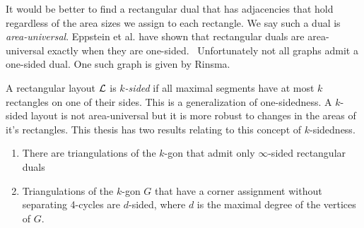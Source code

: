   It would be better to find a rectangular dual that has adjacencies that hold regardless of the area sizes we assign to each rectangle. We say such a dual is \emph{area-universal}.
  Eppstein et al. have shown that rectangular duals are area-universal exactly when they are one-sided.~\cite{Eppstein2012} Unfortunately not all graphs admit a one-sided dual. One such graph is given by Rinsma.~\cite{Rinsma1987} 

  A rectangular layout $\mathcal{L}$ is \emph{$k$-sided} if all maximal segments have at most $k$ rectangles on one of their sides. This is a generalization of one-sidedness. A $k$-sided layout is not area-universal but it is more robust to changes in the areas of it's rectangles. This thesis has two results relating to this concept of $k$-sidedness.
  \begin{enumerate}
    \item There are triangulations of the $k$-gon that admit only $\infty$-sided rectangular duals
    \item Triangulations of the $k$-gon $G$ that have a corner assignment without separating 4-cycles are $d$-sided, where $d$ is the maximal degree of the vertices of $G$.
  \end{enumerate}

